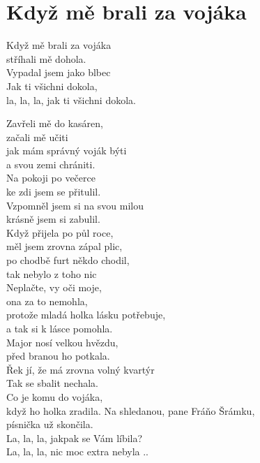 \section{Když mě brali za vojáka}
\onehalfspacing

Když mě brali za vojáka\\
stříhali mě dohola.\\
Vypadal jsem jako blbec\\
Jak ti všichni dokola, \\
la, la, la, jak ti všichni dokola.\\

\singlespacing

\sloka{}
Zavřeli mě do kasáren, \\
začali mě učiti\\
jak mám správný voják býti\\
a svou zemi chrániti.\\

\sloka{}
Na pokoji po večerce \\
ke zdi jsem se přitulil.\\
Vzpomněl jsem si na svou milou\\
krásně jsem si zabulil.\\

\sloka{}
Když přijela po půl roce,\\
měl jsem zrovna zápal plic,\\
po chodbě furt někdo chodil,\\
tak nebylo z toho nic\\

\sloka{}
Neplačte, vy oči moje,\\
ona za to nemohla,\\
protože mladá holka lásku potřebuje,\\
a tak si k lásce pomohla.\\

\sloka{}
Major nosí velkou hvězdu,\\
před branou ho potkala.\\
Řek jí, že má zrovna volný kvartýr\\
Tak se sbalit nechala.\\

\sloka{}
Co je komu do vojáka,\\
když ho holka zradila.
Na shledanou, pane Fráňo Šrámku,\\
písnička už skončila.\\
La, la, la, jakpak se Vám líbila?\\
La, la, la, nic moc extra nebyla ..\\


